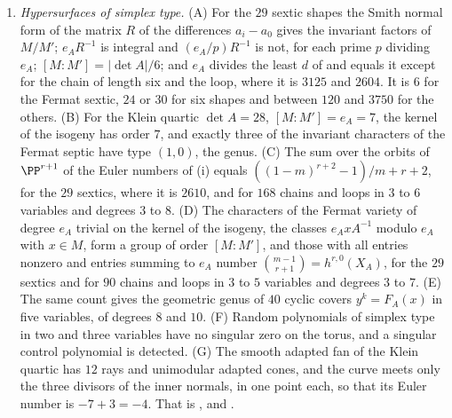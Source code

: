 \begin{enumerate}[label=\textup{(\Roman*)},leftmargin=*]
\item \emph{Hypersurfaces of simplex type.} (A) For the $29$ sextic shapes
  the Smith normal form of the matrix $R$ of the differences $a_{i}-a_{0}$
  gives the invariant factors of $M/M'$; $e_{A}R^{-1}$ is integral and
  $(e_{A}/p)R^{-1}$ is not, for each prime $p$ dividing $e_{A}$;
  $[M:M']=|\det A|/6$; and $e_{A}$ divides the least $d$ of
   and equals it except for the chain of length six and
  the loop, where it is $3125$ and $2604$. It is $6$ for the Fermat sextic,
  $24$ or $30$ for six shapes and between $120$ and $3750$ for the others.
  (B) For the Klein quartic $\det A=28$, $[M:M']=e_{A}=7$, the kernel of the
  isogeny has order $7$, and exactly three of the invariant characters of
  the Fermat septic have type $(1,0)$, the genus. (C) The sum over the
  orbits of $\PP^{r+1}$ of the Euler numbers of
  (i) equals $((1-m)^{r+2}-1)/m+r+2$, for the $29$
  sextics, where it is $2610$, and for $168$ chains and loops in $3$ to $6$
  variables and degrees $3$ to $8$. (D) The characters of the Fermat
  variety of degree $e_{A}$ trivial on the kernel of the isogeny, the
  classes $e_{A}xA^{-1}$ modulo $e_{A}$ with $x\in M$, form a group of order
  $[M:M']$, and those with all entries nonzero and entries summing to $e_{A}$
  number $\binom{m-1}{r+1}=h^{r,0}(X_{A})$, for the $29$ sextics and for
  $90$ chains and loops in $3$ to $5$ variables and degrees $3$ to $7$.
  (E) The same count gives the geometric genus of $40$ cyclic covers
  $y^{k}=F_{A}(x)$ in five variables, of degrees $8$ and $10$. (F) Random
  polynomials of simplex type in two and three variables have no singular
  zero on the torus, and a singular control polynomial is detected. (G) The
  smooth adapted fan of the Klein quartic has $12$ rays and unimodular
  adapted cones, and the curve meets only the three divisors of the inner
  normals, in one point each, so that its Euler number is $-7+3=-4$. That is
  ,  and
  .


\end{enumerate}
